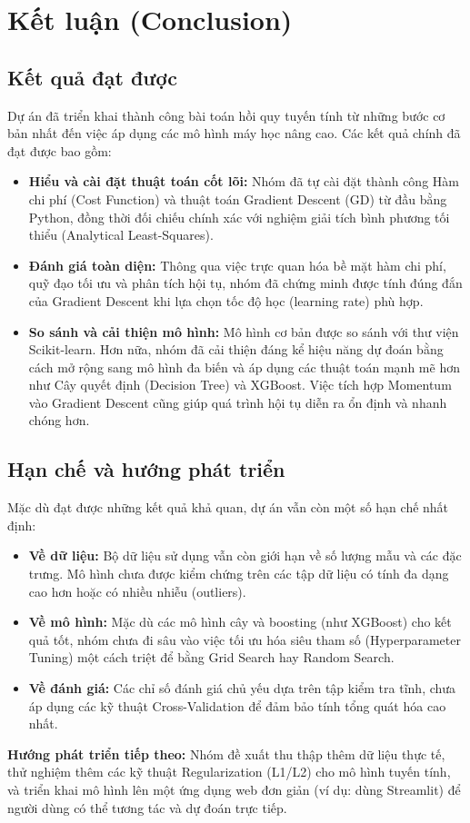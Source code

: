 \section{Kết luận (Conclusion)}

\subsection{Kết quả đạt được}
Dự án đã triển khai thành công bài toán hồi quy tuyến tính từ những bước cơ bản nhất đến việc áp dụng các mô hình máy học nâng cao. Các kết quả chính đã đạt được bao gồm:
\begin{itemize}
    \item \textbf{Hiểu và cài đặt thuật toán cốt lõi:} Nhóm đã tự cài đặt thành công Hàm chi phí (Cost Function) và thuật toán Gradient Descent (GD) từ đầu bằng Python, đồng thời đối chiếu chính xác với nghiệm giải tích bình phương tối thiểu (Analytical Least-Squares).
    \item \textbf{Đánh giá toàn diện:} Thông qua việc trực quan hóa bề mặt hàm chi phí, quỹ đạo tối ưu và phân tích hội tụ, nhóm đã chứng minh được tính đúng đắn của Gradient Descent khi lựa chọn tốc độ học (learning rate) phù hợp.
    \item \textbf{So sánh và cải thiện mô hình:} Mô hình cơ bản được so sánh với thư viện Scikit-learn. Hơn nữa, nhóm đã cải thiện đáng kể hiệu năng dự đoán bằng cách mở rộng sang mô hình đa biến và áp dụng các thuật toán mạnh mẽ hơn như Cây quyết định (Decision Tree) và XGBoost. Việc tích hợp Momentum vào Gradient Descent cũng giúp quá trình hội tụ diễn ra ổn định và nhanh chóng hơn.
\end{itemize}

\subsection{Hạn chế và hướng phát triển}
Mặc dù đạt được những kết quả khả quan, dự án vẫn còn một số hạn chế nhất định:
\begin{itemize}
    \item \textbf{Về dữ liệu:} Bộ dữ liệu sử dụng vẫn còn giới hạn về số lượng mẫu và các đặc trưng. Mô hình chưa được kiểm chứng trên các tập dữ liệu có tính đa dạng cao hơn hoặc có nhiều nhiễu (outliers).
    \item \textbf{Về mô hình:} Mặc dù các mô hình cây và boosting (như XGBoost) cho kết quả tốt, nhóm chưa đi sâu vào việc tối ưu hóa siêu tham số (Hyperparameter Tuning) một cách triệt để bằng Grid Search hay Random Search. 
    \item \textbf{Về đánh giá:} Các chỉ số đánh giá chủ yếu dựa trên tập kiểm tra tĩnh, chưa áp dụng các kỹ thuật Cross-Validation để đảm bảo tính tổng quát hóa cao nhất.
\end{itemize}
\textbf{Hướng phát triển tiếp theo:} Nhóm đề xuất thu thập thêm dữ liệu thực tế, thử nghiệm thêm các kỹ thuật Regularization (L1/L2) cho mô hình tuyến tính, và triển khai mô hình lên một ứng dụng web đơn giản (ví dụ: dùng Streamlit) để người dùng có thể tương tác và dự đoán trực tiếp.

